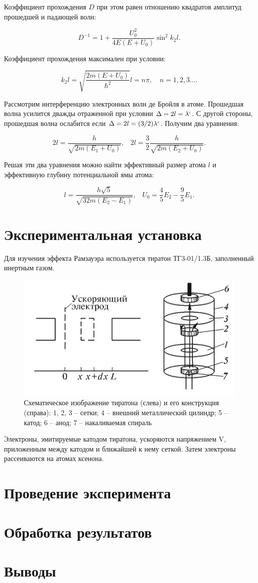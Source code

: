 \documentclass[14pt, a4paper]{report}
\begin{document}
Коэффициент прохождения $D$ при этом равен отношению квадратов амплитуд прошедшей и падающей волн:

\[D^{-1}=1+\frac{U_0^2}{4E(E+U_0)}\sin^2{k_2l}\text{.}\]

Коэффициент прохождения максимален при условии:

\[k_2l=\sqrt{\frac{2m(E + U_0)}{\hbar^2}}l=n\pi,\quad n=1,2,3...\text{.}\]

Рассмотрим интерференцию электронных волн де Бройля в атоме. Прошедшая волна усилится дважды отраженной при условии $\Delta=2l=\lambda`$. С другой стороны, прошедшая волна ослабится если $\Delta=2l=(3/2)\lambda`$. Получим два уравнения:

\[2l=\frac{h}{\sqrt{2m(E_1+U_0)}}\text{,}\quad 2l=\frac{3}{2}\frac{h}{\sqrt{2m(E_2+U_0)}}\text{.}\]

Решая эти два уравнения можно найти эффективный размер атома $l$ и эффективную глубину потенциальной ямы атома:

\[l=\frac{h\sqrt{5}}{\sqrt{32m(E_2-E_1)}}\text{,}\quad U_0=\frac{4}{5}E_2-\frac{9}{5}E_1\text{.}\]

\section{Экспериментальная установка}

Для изучения эффекта Рамзауэра используется тиратон ТГ3-01/1.3Б, заполненный инертным газом.

\begin{figure}[H]
\centering
\includegraphics[scale=0.8]{../images/513-3}
\caption{Схематическое изображение тиратона (слева) и его конструкция (справа): 1, 2, 3 -- сетки; 4 -- внешний металлический цилиндр; 5 -- катод; 6 -- анод; 7 -- накаливаемая спираль}
\end{figure}

Электроны, эмитируемые катодом тиратона, ускоряются напряжением V, приложенным между катодом и ближайшей к нему сеткой. Затем электроны рассеиваются на атомах ксенона.

\section{Проведение эксперимента}

\section{Обработка результатов}

\section{Выводы}
\end{document}
